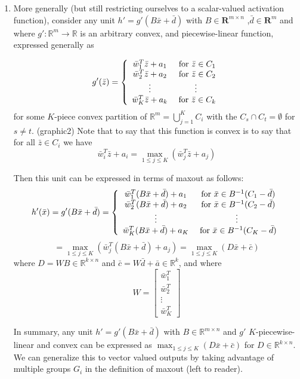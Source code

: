 \documentclass{article}
\begin{document}
\begin{itemize}
\begin{enumerate}
\item More generally (but still restricting ourselves to a scalar-valued activation function), consider any unit $h' = g'(B\bar{x} + \bar{d})$ with $B\in \mathbf{R}^{m\times n} $ ,$\bar{d}\in \mathbf{R}^{m}$ and where $g':\mathbb{R}^{m}\rightarrow \mathbb{R}$ is an arbitrary convex, and piecewise-linear function, expressed generally as 

$$g'(\bar{z}) = \left\{ \begin{array}{cc}
\bar{w}_{1}^{T}\bar{z} + a_{1} & \hbox{ for } \bar{z} \in C_1 \\
\bar{w}_{2}^{T}\bar{z} + a_{2} & \hbox{ for } \bar{z} \in C_2 \\
\vdots & \vdots \\
\bar{w}_{K}^{T}\bar{z} + a_{k} & \hbox{ for } \bar{z} \in C_k 
\end{array} \right.$$
for some $K$-piece convex partition of $\mathbb{R}^m = \bigcup_{j =1}^{K} C_{i}$ with the $C_s \cap C_t = \emptyset$ for $s \neq t$. (graphic2)
Note that to say that this function is convex is to say that for all $\bar{z} \in C_{i}$ we have $$\bar{w}_{i}^{T}\bar{z} + a_{i} = \max_{1\leq j \leq K} {(\bar{w}_{j}^{T}\bar{z} + a_{j})}$$

Then this unit can be expressed in terms of maxout as follows:
$$h'(\bar{x}) = g'(B\bar{x} + \bar{d}) = \left\{ \begin{array}{cc}
\bar{w}_{1}^{T}(B\bar{x} + \bar{d})+ a_{1} & \hbox{ for } \bar{x}  \in B^{-1}(C_1 - \bar{d}) \\
\bar{w}_{2}^{T}(B\bar{x} + \bar{d}) + a_{2} & \hbox{ for } \bar{x}  \in B^{-1}(C_2 - \bar{d}) \\
\vdots & \vdots \\
\bar{w}_{K}^{T}(B\bar{x} + \bar{d}) + a_{K} & \hbox{ for } \bar{x}  \in B^{-1}(C_K - \bar{d})
\end{array} \right.$$
$$= \max_{1\leq j \leq K} {\left(\bar{w}_{j}^{T}(B\bar{x} + \bar{d})+ a_{j} \right)} =  \max_{1\leq j \leq K} {\left( D\bar{x} + \bar{c}\right)} $$ where
$D = WB \in \mathbb{R}^{k\times n}$ and $\bar{c} = W\bar{d} + \bar{a} \in \mathbb{R}^{k}$, and where 
$$W = \left[ \begin{array}{c} \bar{w}_{1}^{T}\\ \bar{w}_{2}^{T}\\ \vdots \\ \bar{w}_{K}^{T} \end{array} \right]$$

In summary, any unit $h' = g'(B\bar{x} + \bar{d})$ with  $B\in \mathbb{R}^{m\times n}$ and $g'$ $K$-piecewise-linear and convex can be expressed as $\max_{1\leq j \leq K} {\left( D\bar{x} + \bar{c}\right)}$ for $D\in \mathbb{R}^{k\times n}$. We can generalize this to vector valued outputs by taking advantage of multiple groups $G_i$ in the definition of maxout (left to reader).


\end{enumerate}
\end{itemize}
\end{document}
